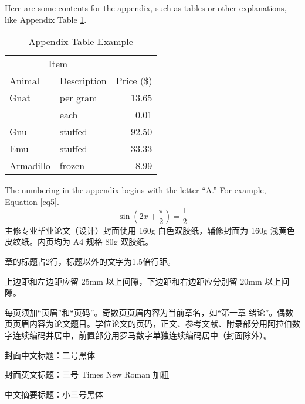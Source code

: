 \documentclass{xmu}
\begin{document}

\begin{appendix}
    Here are some contents for the appendix, such as tables or other explanations, like Appendix Table \ref{atable}.
    \begin{table}[!htb]
        \centering
        \caption{Appendix Table Example}
        \label{atable}
        \begin{tabular}{llr}
            \hline
            \multicolumn{2}{c}{Item} &                          \\ \cline{1-2}
            Animal                   & Description & Price (\$) \\ \hline
            Gnat                     & per gram    & 13.65      \\
                                     & each        & 0.01       \\
            Gnu                      & stuffed     & 92.50      \\
            Emu                      & stuffed     & 33.33      \\
            Armadillo                & frozen      & 8.99       \\ \hline
        \end{tabular}
    \end{table}
    The numbering in the appendix begins with the letter ``A.'' For example, Equation \ref{eq5}.
    \begin{equation}\label{eq5}
        \sin \left(2x+\frac\pi2\right)=\frac 12
    \end{equation}
    主修专业毕业论文（设计）封面使用 160g 白色双胶纸，辅修封面为 160g 浅黄色皮纹纸。内页均为 A4 规格 80g 双胶纸。\par
    章的标题占2行，标题以外的文字为1.5倍行距。\par
    上边距和左边距应留 25mm 以上间隙，下边距和右边距应分别留 20mm 以上间隙。\par
    每页须加“页眉”和“页码”。奇数页页眉内容为当前章名，如“第一章 绪论”。偶数页页眉内容为论文题目。学位论文的页码，正文、参考文献、附录部分用阿拉伯数字连续编码并居中，前置部分用罗马数字单独连续编码居中（封面除外）。\par
    封面中文标题：二号黑体\par
    封面英文标题：三号 Times New Roman 加粗\par
    中文摘要标题：小三号黑体\par

\end{appendix}
\end{document}
